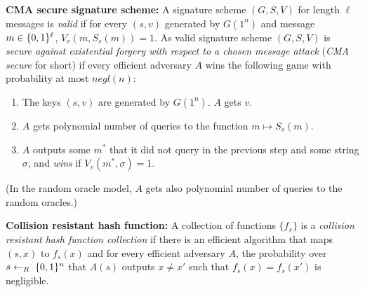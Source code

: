 \documentclass{article}
\begin{document}
\textbf{CMA secure signature scheme:} A signature scheme $(G,S,V)$ for length $\ell$ messages is \emph{valid} if for every $(s,v)$ generated by $G(1^n)$ and message $m\in\{0,1\}^\ell$,
$V_v(m,S_s(m))=1$. As valid signature scheme $(G,S,V)$ is \emph{secure against existential forgery with respect to a chosen message attack} (\emph{CMA secure} for short) if every efficient adversary $A$ wins the following game with probability at most $negl(n)$:%

\begin{enumerate}[noitemsep,topsep=\mdcompacttopsep]%

\item{}The keys $(s,v)$ are generated by $G(1^n)$. $A$ gets $v$.%

\item{}$A$ gets polynomial number of queries to the function $m \mapsto S_s(m)$.%

\item{}$A$ outputs some $m^*$ that it did not query in the previous step and some string $\sigma$, and \emph{wins} if $V_v(m^*,\sigma)=1$.%
\end{enumerate}%

\noindent{}(In the random oracle model, $A$ gets also polynomial number of queries to the random oracles.)%

\textbf{Collision resistant hash function:}
A collection of functions $\{ f_s \}$ is a \emph{collision resistant hash function collection} if there is an efficient algorithm that maps $(s,x)$ to $f_s(x)$ and for every efficient adversary $A$, the probability over $s \leftarrow_R\;\{0,1\}^n$ that  $A(s)$ outputs $x \neq x'$ such that $f_s(x)=f_{s}(x')$ is negligible.%
\end{document}
